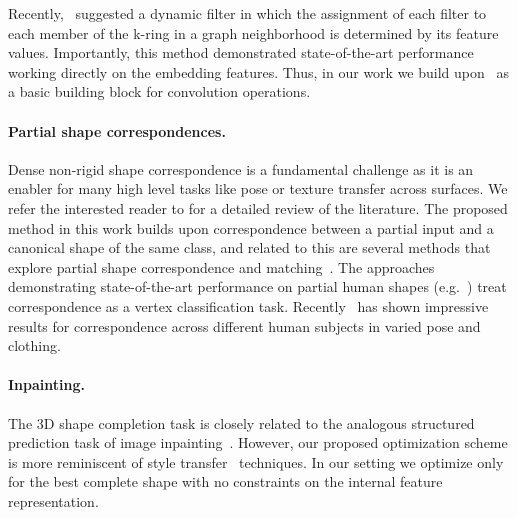 Recently,~\cite{dynFilt} suggested a dynamic filter in which the assignment of each filter to each member of the k-ring in a graph neighborhood is determined by its feature values. Importantly, this method demonstrated state-of-the-art performance working directly on the embedding features. Thus, in our work we build upon~\cite{dynFilt} as a basic building block for convolution operations. 

\paragraph{Partial shape correspondences.}
Dense non-rigid shape correspondence \cite{kim11,chen15,fmnet,rodola14,bronstein2006generalized} is a fundamental challenge as it is an enabler for many high level tasks like pose or texture transfer across surfaces. We refer the interested reader to \cite{van2011survey,biasotti2015recent} for a detailed review of the literature. The proposed method in this work builds upon correspondence between a partial input and a canonical shape of the same class, and related to this are several methods that explore partial shape correspondence and matching~\cite{rodola16-partial,monet,litany17fully}. The approaches demonstrating state-of-the-art performance on partial human shapes (e.g.~\cite{monet}) treat correspondence as a vertex classification task. Recently~\cite{wei2016dense} has shown impressive results for correspondence across different human subjects in varied pose and clothing. 

\paragraph{Inpainting.}
The 3D shape completion task is closely related to the analogous structured prediction task of image inpainting~\cite{pathakCVPR16context,Yang_2017_CVPR}. However, our proposed optimization scheme is more reminiscent of style transfer~\cite{gatysStyleTransfer} techniques. In our setting we optimize only for the best complete shape with no constraints on the internal feature representation.